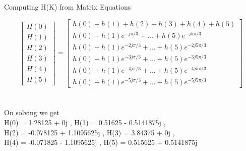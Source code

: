 \documentclass{beamer}
\begin{document}
\begin{frame}{Computing H(K) from Matrix Equations}

       \[
    \begin{bmatrix} H(0) \\ H(1) \\ H(2) \\ H(3) \\ H(4) \\ H(5) \end{bmatrix}
=
\begin{bmatrix}
h(0) + h(1) + h(2) + h(3) + h(4) + h(5) \\h(0) + h(1)e^{-j\pi /3} + ... + h(5)e^{-j5\pi /3}\\h(0) + h(1)e^{-2j\pi /3} + ... + h(5)e^{-2j5\pi /3}\\h(0) + h(1)e^{-3j\pi /3} + ... + h(5)e^{-3j5\pi /3}\\
h(0) + h(1)e^{-4j\pi /3} + ... + h(5)e^{-4j5\pi /3}\\h(0) + h(1)e^{-5j\pi /3} + ... + h(5)e^{-5j5\pi /3}
\end{bmatrix}
\]  \\~\\
 On solving we get\\
H(0) = 1.28125 + 0j \;,
H(1) = 0.51625 - 0.5141875j \; ,\\
H(2) = -0.078125 + 1.1095625j \;,
H(3) = 3.84375 + 0j \;,\\
H(4) = -0.071825 - 1.1095625j \;,
H(5) = 0.515625 + 0.5141875j

\end{frame}
\end{document}
